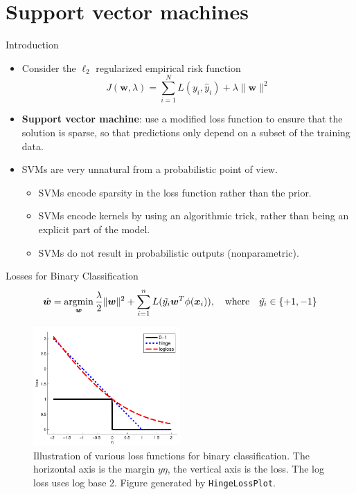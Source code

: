 \documentclass[10pt,mathserif]{beamer}
\begin{document}
\section{Support vector machines}
\begin{frame}{Introduction}
\begin{itemize}
    \item Consider the $\ell_2$ regularized empirical risk function
    \begin{equation*}
        J(\bm{w}, \lambda) = \sum_{i=1}^NL(y_i, \hat{y}_i) + \lambda\|\bm{w}\|^2
    \end{equation*}
    \item \textbf{Support vector machine}: use a modified loss function to ensure that the solution is sparse, so that predictions only depend on a subset of the training data.
    \item SVMs are very unnatural from a probabilistic point of view.
    \begin{itemize}
        \item SVMs encode sparsity in the loss function rather than the prior.
        \item SVMs encode kernels by using an algorithmic trick, rather than being an explicit part of the model.
        \item SVMs do not result in probabilistic outputs (nonparametric).
    \end{itemize}
\end{itemize}
\end{frame}

\begin{frame}{Losses for Binary Classification}
\begin{equation*}
    \hat{\bm{w}} = \mathop{\rm argmin}_{\bm{w}} \frac{\lambda}{2}\|\bm{w}\|^2 + \sum_{i=1}^n L(\tilde{y_i} \bm{w}^T\phi(\bm{x}_i)), \quad \text{where} \quad \tilde{y_i}\in\{+1, -1\}
\end{equation*}
\begin{figure}[h]
\centering
\includegraphics[width=0.5\textwidth]{hingeLoss}
\caption{Illustration of various loss functions for binary classification. The horizontal axis is the margin $y\eta$, the vertical axis is the loss. The log loss uses log base 2. Figure generated by \texttt{HingeLossPlot}.}
\end{figure}
\end{frame}
\end{document}
